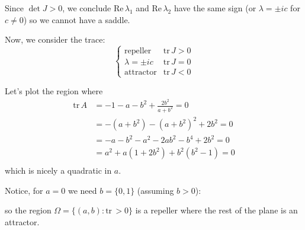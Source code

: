 \documentclass[12pt]{report}
\newcommand{\tr}{\text{tr}\,}
\renewcommand{\Re}{\text{Re}\,}
\begin{document}
Since $\det J > 0$, we conclude $\Re \lambda_1$ and $\Re \lambda_2$ have the same sign (or $\lambda = \pm ic$ for $c \neq 0$) so we cannot have a saddle.

Now, we consider the trace:
\[\begin{cases}
        \text{repeller}  & \tr J > 0 \\
        \lambda = \pm ic & \tr J = 0 \\
        \text{attractor} & \tr J < 0
    \end{cases}\]

Let's plot the region where
\begin{align*}
    \tr A & = -1 - a - b^2 + \frac{2b^2}{a + b^2} = 0 \\
          & = -(a+b^2) - (a+b^2)^2 + 2b^2 = 0         \\
          & = -a - b^2 - a^2 - 2ab^2 - b^4 + 2b^2 = 0 \\
          & = a^2 + a(1 + 2b^2) + b^2(b^2 - 1) = 0    \\
\end{align*}
which is nicely a quadratic in $a$.

Notice, for $a = 0$ we need $b = \{0, 1\}$ (assuming $b > 0$):

\begin{center}
\end{center}
so the region $\Omega = \{(a, b): \tr > 0\}$ is a repeller where the rest of the plane is an attractor.
\end{document}
